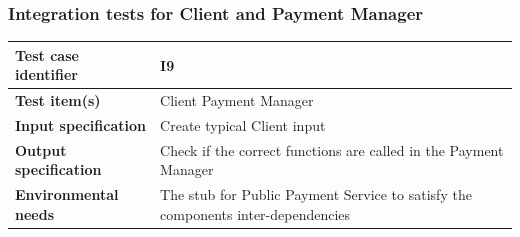 \documentclass[a4paper,11pt]{report} %
\begin{document}
		\subsubsection{Integration tests for Client and Payment Manager} \label{sec:3.1.6}
			\begin{minipage}{\linewidth}
			\end{minipage}
		\begin{center}
			\renewcommand{\arraystretch}{1.2}
			\setlength{\tabcolsep}{24pt}
			\begin{tabular}{ l  p{9cm}}\hline
				\textbf{Test case identifier} & I9\\\hline
				\textbf{Test item(s)} & Client \textrightarrow Payment Manager\\\hline
				\textbf{Input specification} & Create typical Client input \\\hline
				\textbf{Output specification} & Check if the correct functions are called in the Payment Manager\\\hline
				\textbf{Environmental needs} &  The stub for Public Payment Service to satisfy the components inter-dependencies\\\hline
			\end{tabular}
		\end{center}
		
		\pagebreak		
\end{document}
